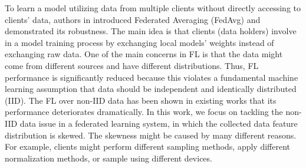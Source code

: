 \documentclass[mathfont=newtx]{uai2023} %
\begin{document}
To learn a model utilizing data from multiple clients without directly accessing to clients' data, authors in \cite{OriginFL} introduced Federated Averaging (FedAvg) and demonstrated its robustness. The main idea is that clients (data holders) involve in a model training process by exchanging local models' weights instead of exchanging raw data. One of the main concerns in FL is that the data might come from different sources and have different distributions. Thus, FL performance is significantly reduced because this violates a fundamental machine learning assumption that data should be independent and identically distributed (IID). The FL over non-IID data has been shown in existing works \cite{ZHU2021371,Sahu2018OnTC,9392310,abs_1905_06641,Shen2020FederatedML,9155494,abs-2102-02079,abs-2005-11418} that its performance deteriorates dramatically. In this work, we focus on tackling the non-IID data issue in a federated learning system, in which the collected data feature distribution is skewed. The skewness might be caused by many different reasons. For example, clients might perform different sampling methods, apply different normalization methods, or sample using different devices. 
\end{document}
